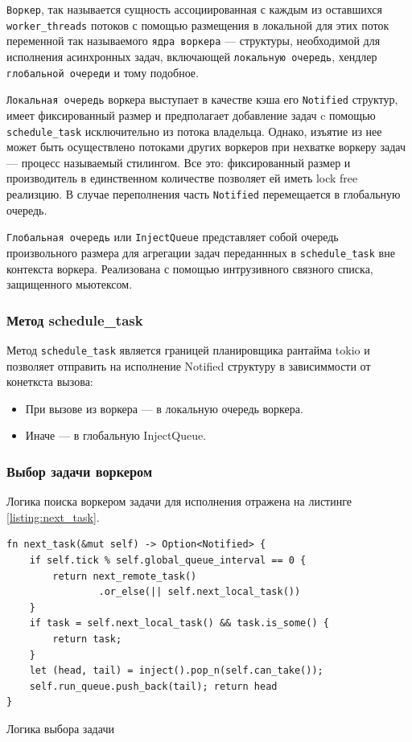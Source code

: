\verb|Воркер|, так называется сущность ассоциированная с каждым из оставшихся \verb|worker_threads| потоков с помощью размещения в локальной для этих поток переменной так называемого \verb|ядра воркера| --- структуры, необходимой для исполнения асинхронных задач, включающей \verb|локальную очередь|, хендлер \verb|глобальной очереди| и тому подобное.

\verb|Локальная очередь| воркера выступает в качестве кэша его \verb|Notified| структур, имеет фиксированный размер и предполагает добавление задач c помощью \verb|schedule_task| исключительно из потока владельца. Однако, изъятие из нее может быть осуществлено потоками других воркеров при нехватке воркеру задач --- процесс называемый стилингом. Все это: фиксированный размер и производитель в единственном количестве позволяет ей иметь lock free реализцию. В случае переполнения часть \verb|Notified| перемещается в глобальную очередь.

\verb|Глобальная очередь| или \verb|InjectQueue| представляет собой очередь произвольного размера для агрегации задач переданнных в \verb|schedule_task| вне контекста воркера. Реализована с помощью интрузивного связного списка, защищенного мьютексом.

\subsubsection{Метод schedule\_task}

Метод \verb|schedule_task| является границей планировщика рантайма tokio и позволяет отправить на исполнение Notified структуру в зависиммости от конеткста вызова:

\begin{itemize}
    \item При вызове из воркера --- в локальную очередь воркера.
    \item Иначе --- в глобальную InjectQueue.
\end{itemize}

\subsubsection{Выбор задачи воркером}

Логика поиска воркером задачи для исполнения отражена на листинге \ref{listing:next_task}.

\begin{listing}[H]
    \begin{verbatim}
fn next_task(&mut self) -> Option<Notified> {
    if self.tick % self.global_queue_interval == 0 {
        return next_remote_task()
                .or_else(|| self.next_local_task())
    }
    if task = self.next_local_task() && task.is_some() {
        return task;
    }
    let (head, tail) = inject().pop_n(self.can_take());
    self.run_queue.push_back(tail); return head
}
    \end{verbatim}

    \caption{Логика выбора задачи}
    \label{listing:next_task}
\end{listing}

